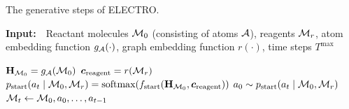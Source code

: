 \begin{algorithm}[t]
  \caption{The generative steps of ELECTRO.}
  {\bf Input:}~~Reactant molecules ${\mathcal{M}}_0$ (consisting of atoms ${\mathcal{A}}$), reagents ${\mathcal{M}}_r$, atom embedding function $g_{{\mathcal{A}}}(\cdot)$, graph embedding function $r(\cdot)$, time steps $T^\mathrm{max}$
  
  \begin{algorithmic}[1]
  	\STATE ${\mathbf{H}}_{{\mathcal{M}}_0} = g_{{\mathcal{A}}}({\mathcal{M}}_0)$ 
  	\STATE $\bm{c}_\mathrm{reagent} = r({\mathcal{M}}_r)$ 
  	\STATE $p_{\mathrm{start}}(a_t \mid {\mathcal{M}}_0, {\mathcal{M}}_r) = \mbox{softmax}(f_{\textrm{start}}({\mathbf{H}}_{{\mathcal{M}}_0}, \bm{c}_\mathrm{reagent}))$ 
  	\STATE $a_{0} \sim p_{\mathrm{start}}(a_t \mid {\mathcal{M}}_0, {\mathcal{M}}_r)$
  		\STATE ${\mathcal{M}}_t \leftarrow {\mathcal{M}}_{0}, a_0, \ldots, a_{t-1}$ 
  	\ENDFOR
  	
	
				
			
			

\end{algorithmic}
\end{algorithm}
